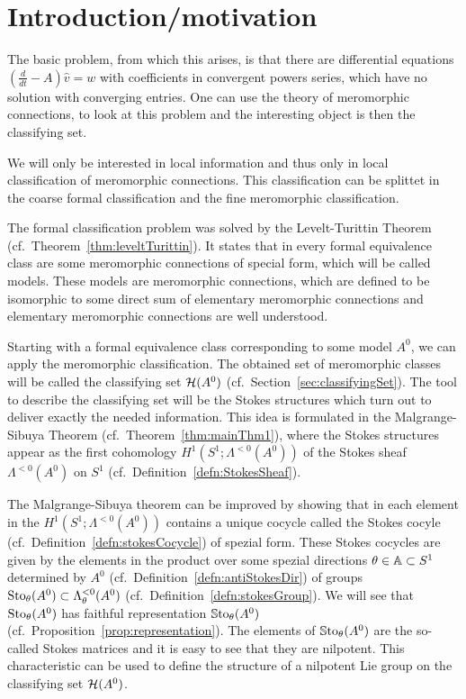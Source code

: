 \chapter{Introduction/motivation}


The basic problem, from which this  arises, is that
there are differential equations $(\frac{d}{dt}-A)\hat v=w$ with coefficients
in convergent powers series, which have no solution with converging entries.
One can use the theory of meromorphic connections, to look at this problem and
the interesting object is then the classifying set.



We will only be interested in local information and thus only in local
classification of meromorphic connections.
This classification can be splittet in the coarse formal classification and the
fine meromorphic classification.

The formal classification problem was solved by the Levelt-Turittin Theorem
(cf.\ Theorem~\ref{thm:leveltTurittin}). It states that in every formal
equivalence class are some meromorphic connections of special form, which will
be called models.
These models are meromorphic connections, which are defined to be isomorphic to
some direct sum of elementary meromorphic connections and elementary
meromorphic connections are well understood.

Starting with a formal equivalence class corresponding to some model $A^0$, we
can apply the meromorphic classification.
The obtained set of meromorphic classes will be called the classifying set
$\mathcal{H}(A^0)$ (cf.\ Section~\ref{sec:classifyingSet}).
The tool to describe the classifying set will be the Stokes structures which
turn out to deliver exactly the needed information.
This idea is formulated in the Malgrange-Sibuya Theorem
(cf.\ Theorem~\ref{thm:mainThm1}), where the Stokes structures appear as the
first cohomology $H^1(S^1;\Lambda^{<0}(A^0))$ of the Stokes sheaf
$\Lambda^{<0}(A^0)$ on $S^1$ (cf.\ Definition~\ref{defn:StokesSheaf}).

The Malgrange-Sibuya theorem can be improved by showing that in each element
in the $H^1(S^1;\Lambda^{<0}(A^0))$ contains a unique cocycle called the Stokes
cocyle (cf.\ Definition~\ref{defn:stokesCocycle}) of spezial form.
These Stokes cocycles are given by the elements in the product over some
spezial directions $\theta\in\mathbb{A}\subset S^1$ determined by $A^0$
(cf.\ Definition~\ref{defn:antiStokesDir}) of groups
$\operatorname{Sto}_\theta(A^0)\subset\Lambda_\theta^{<0}(A^0)$
(cf.\ Definition~\ref{defn:stokesGroup}).
We will see that $\operatorname{Sto}_\theta(A^0)$ has faithful representation
$\operatorname{\mathbb{S}to}_\theta(A^0)$ (cf.\ Proposition~\ref{prop:representation}).
The elements of $\operatorname{\mathbb{S}to}_\theta(A^0)$ are the so-called Stokes matrices and it is
easy to see that they are nilpotent.
This characteristic can be used to define the structure of a nilpotent Lie
group on the classifying set $\mathcal{H}(A^0)$.

